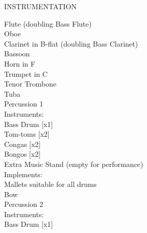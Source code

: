 \documentclass[11pt]{article}
\begin{document}
\endgroup

\vspace*{8\baselineskip}

\begin{center}
\huge INSTRUMENTATION
\end{center}

\hspace*{1cm} Flute (doubling Bass Flute)
\\
\hspace*{1cm} Oboe
\\
\hspace*{1cm} Clarinet in B-flat (doubling Bass Clarinet)
\\
\hspace*{1cm} Bassoon
\\
\hspace*{1cm} Horn in F
\\
\hspace*{1cm} Trumpet in C
\\
\hspace*{1cm} Tenor Trombone
\\
\hspace*{1cm} Tuba
\\
\hspace*{1cm} Percussion 1
\\
\hspace*{2cm} Instruments:
\\
\hspace*{3cm} Bass Drum [x1]
\\
\hspace*{3cm} Tom-toms [x2]
\\
\hspace*{3cm} Congas [x2]
\\
\hspace*{3cm} Bongos [x2]
\\
\hspace*{3cm} Extra Music Stand (empty for performance)
\\
\hspace*{2cm} Implements:
\\
\hspace*{3cm} Mallets suitable for all drums
\\
\hspace*{3cm} Bow
\\
\hspace*{1cm} Percussion 2
\\
\hspace*{2cm} Instruments:
\\
\hspace*{3cm} Bass Drum [x1]
\end{document}
